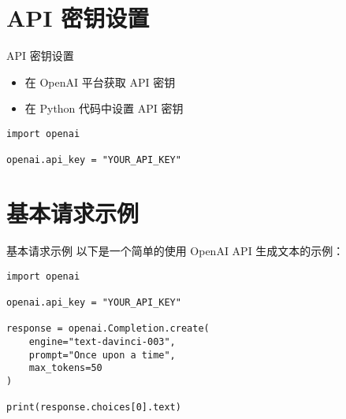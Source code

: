 \section{API 密钥设置}
\begin{frame}{API 密钥设置}
    \begin{itemize}
        \item 在 OpenAI 平台获取 API 密钥
        \item 在 Python 代码中设置 API 密钥
    \end{itemize}
    \begin{lstlisting}[style=pythonstyle]
import openai

openai.api_key = "YOUR_API_KEY"
    \end{lstlisting}
\end{frame}

\section{基本请求示例}
\begin{frame}{基本请求示例}
    以下是一个简单的使用 OpenAI API 生成文本的示例：
    \begin{lstlisting}[style=pythonstyle]
import openai

openai.api_key = "YOUR_API_KEY"

response = openai.Completion.create(
    engine="text-davinci-003",
    prompt="Once upon a time",
    max_tokens=50
)

print(response.choices[0].text)
    \end{lstlisting}
\end{frame}

